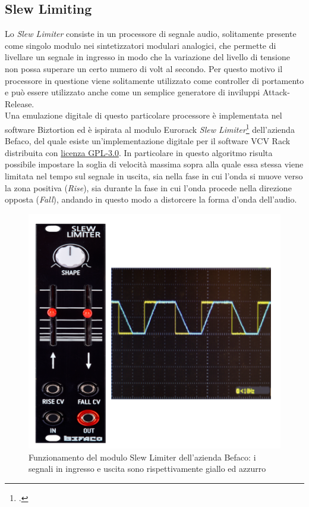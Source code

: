 \subsection{Slew Limiting}
Lo \textit{Slew Limiter} consiste in un processore di segnale audio, solitamente presente come singolo modulo nei sintetizzatori modulari analogici, che permette di livellare un segnale in ingresso in modo che la variazione del livello di tensione non possa superare un certo numero di volt al secondo. Per questo motivo il processore in questione viene solitamente utilizzato come controller di portamento e può essere utilizzato anche come un semplice generatore di inviluppi Attack-Release.\\
Una emulazione digitale di questo particolare processore è implementata nel software Biztortion ed è ispirata al modulo Eurorack \textit{Slew Limiter}\footcite{site:slewlimiter} dell'azienda Befaco, del quale esiste un'implementazione digitale per il software VCV Rack distribuita con \hyperref[cap:licenze-software]{licenza GPL-3.0}. In particolare in questo algoritmo risulta possibile impostare la soglia di velocità massima sopra alla quale essa stessa viene limitata nel tempo sul segnale in uscita, sia nella fase in cui l'onda si muove verso la zona positiva (\textit{Rise}), sia durante la fase in cui l'onda procede nella direzione opposta (\textit{Fall}), andando in questo modo a distorcere la forma d'onda dell'audio.
\begin{figure}[!h] 
    \centering 
    \includegraphics[width=0.8\columnwidth]{immagini/cap2/slew-limiter_Befaco.png}
    \caption{Funzionamento del modulo Slew Limiter dell'azienda Befaco: i segnali in ingresso e uscita sono rispettivamente giallo ed azzurro}
\end{figure}

